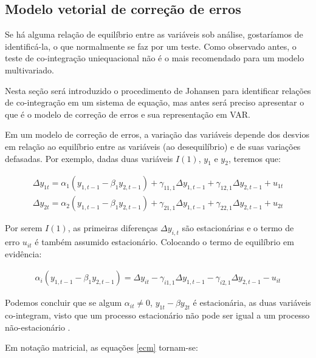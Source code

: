 \documentclass[a4paper,
               article,
               12pt,
               openany,
               oneside,
               english,
               brazil]{abntex2}
\numberwithin{equation}{section}
\begin{document}
    \subsection{Modelo vetorial de correção de erros}

    Se há alguma relação de equilíbrio entre as variáveis sob análise, gostaríamos de identificá-la, o que normalmente se faz por um teste. Como observado antes, o teste de co-integração uniequacional não é o mais recomendado para um modelo multivariado.
    
    Nesta seção será introduzido o procedimento de Johansen para identificar relações de co-integração em um sistema de equação, mas antes será preciso apresentar o que é o modelo de correção de erros e sua representação em VAR.

    Em um modelo de correção de erros, a variação das variáveis depende dos desvios em relação ao equilíbrio entre as variáveis (ao desequilíbrio) e de suas variações defasadas. Por exemplo, dadas duas variáveis $ I(1) $, $ y_1 $ e $ y_2 $, teremos que:

    \begin{equation}
        \begin{aligned}
            \label{ecm}
            \Delta y_{1t} = \alpha_1 (y_{1,t-1} - \beta_1 y_{2, t-1}) + \gamma_{11,1} \Delta y_{1,t-1} + \gamma_{12,1} \Delta y_{2,t-1} + u_{1t} \\
            \Delta y_{2t} = \alpha_2 (y_{1,t-1} - \beta_1 y_{2, t-1}) + \gamma_{21,1} \Delta y_{1,t-1} + \gamma_{22,1} \Delta y_{2,t-1} + u_{2t}
        \end{aligned}
    \end{equation}

    Por serem $ I(1) $, as primeiras diferenças $ \Delta y_{i,t} $ são estacionárias e o termo de erro $ u_{it} $ é também assumido estacionário. Colocando o termo de equilíbrio em evidência:

    \begin{align*}
        \alpha_i (y_{1,t-1} - \beta_1 y_{2, t-1}) = \Delta y_{it} - \gamma_{i1,1} \Delta y_{1,t-1} - \gamma_{i2,1} \Delta y_{2,t-1} - u_{it}
    \end{align*}

    Podemos concluir que se algum $ \alpha_{it} \neq 0 $, $ y_{1t} - \beta y_{2t} $ é estacionária, as duas variáveis co-integram, visto que um processo estacionário não pode ser igual a um processo não-estacionário \cite[p.~244-247]{lutkepool}.

    Em notação matricial, as equações \eqref{ecm} tornam-se:
\end{document}
